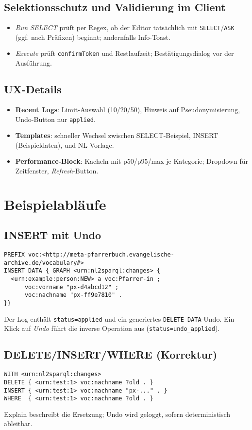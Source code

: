 \subsection{Selektionsschutz und Validierung im Client}
\begin{itemize}
  \item \emph{Run SELECT} prüft per Regex, ob der Editor tatsächlich mit \texttt{SELECT}/\texttt{ASK} (ggf. nach Präfixen) beginnt; andernfalls Info-Toast.
  \item \emph{Execute} prüft \texttt{confirmToken} und Restlaufzeit; Bestätigungsdialog vor der Ausführung.
\end{itemize}

\subsection{UX-Details}
\begin{itemize}
  \item \textbf{Recent Logs}: Limit-Auswahl (10/20/50), Hinweis auf Pseudonymisierung, Undo-Button nur \texttt{applied}.
  \item \textbf{Templates}: schneller Wechsel zwischen SELECT-Beispiel, INSERT (Beispieldaten), und NL-Vorlage.
  \item \textbf{Performance-Block}: Kacheln mit p50/p95/max je Kategorie; Dropdown für Zeitfenster, \emph{Refresh}-Button.
\end{itemize}

\section{Beispielabläufe}
\subsection{INSERT mit Undo}
\begin{lstlisting}[language=SPARQL, basicstyle=\ttfamily\small]
PREFIX voc:<http://meta-pfarrerbuch.evangelische-archive.de/vocabulary#>
INSERT DATA { GRAPH <urn:nl2sparql:changes> {
  <urn:example:person:NEW> a voc:Pfarrer-in ;
      voc:vorname "px-d4abcd12" ;
      voc:nachname "px-ff9e7810" .
}}
\end{lstlisting}
\noindent Der Log enthält \texttt{status=applied} und ein generiertes \texttt{DELETE DATA}-Undo. Ein Klick auf \emph{Undo} führt die inverse Operation aus (\texttt{status=undo\_applied}).

\subsection{DELETE/INSERT/WHERE (Korrektur)}
\begin{lstlisting}[language=SPARQL, basicstyle=\ttfamily\small]
WITH <urn:nl2sparql:changes>
DELETE { <urn:test:1> voc:nachname ?old . }
INSERT { <urn:test:1> voc:nachname "px-..." . }
WHERE  { <urn:test:1> voc:nachname ?old . }
\end{lstlisting}
\noindent Explain beschreibt die Ersetzung; Undo wird geloggt, sofern deterministisch ableitbar.

